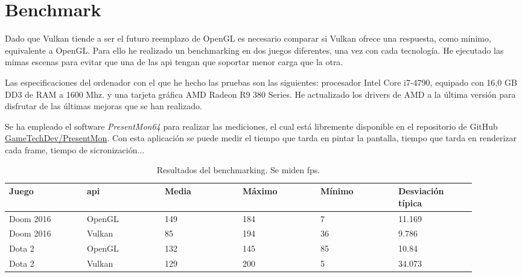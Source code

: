 \chapter{Benchmark}
Dado que Vulkan tiende a ser el futuro reemplazo de OpenGL es necesario comparar si Vulkan ofrece una respuesta, como
mínimo, equivalente a OpenGL. Para ello he realizado un benchmarking en dos juegos diferentes, una vez con cada
tecnología. He ejecutado las mimas escenas para evitar que una de las \gls{api} tengan que soportar menor carga
que la otra.

Las especificaciones del ordenador con el que he hecho las pruebas son las siguientes: procesador Intel Core i7-4790,
equipado con 16,0 GB DD3 de RAM a 1600 Mhz. y una tarjeta gráfica AMD Radeon R9 380 Series. He actualizado los drivers
de AMD a la última versión para disfrutar de las últimas mejoras que se han realizado.

Se ha empleado el software \emph{PresentMon64} para realizar las mediciones, el cual está libremente disponible en
el repositorio de GitHub \href{https://github.com/GameTechDev/PresentMon}{GameTechDev/PresentMon}. Con esta aplicación
se puede medir el tiempo que tarda en pintar la pantalla, tiempo que tarda en renderizar cada frame, tiempo de
sicronización...

\begin{table*}[t]
  \centering
  \begin{tabular}{p{0.15\linewidth}p{0.15\linewidth}p{0.15\linewidth}p{0.15\linewidth}p{0.15\linewidth}p{0.15\linewidth}}
    \toprule
    Juego & \gls{api}    & Media & Máximo & Mínimo & Desviación típica \\
    \midrule
    Doom 2016   & OpenGL  & 149 & 184 & 7   & 11.169 \\
    Doom 2016   & Vulkan  & 85  & 194 & 36  & 9.786 \\
    Dota 2      & OpenGL  & 132 & 145 & 85  & 10.84 \\
    Dota 2      & Vulkan  & 129 & 200 & 5   & 34.073 \\
    \bottomrule
  \end{tabular}
  \caption{Resultados del benchmarking. Se miden \gls{fps}.}
  \label{tab:benchmarking_results}
\end{table*}
